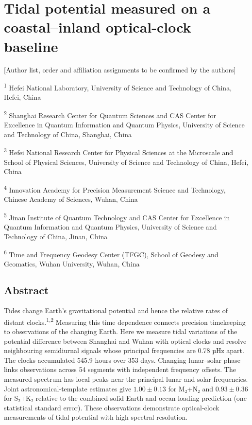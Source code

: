 \documentclass[
  10pt,
  a4paper,
]{article}
\author{}
\date{}
\begin{document}
\hypertarget{tidal-potential-measured-on-a-coastalinland-optical-clock-baseline}{%
\section{Tidal potential measured on a coastal--inland optical-clock
baseline}\label{tidal-potential-measured-on-a-coastalinland-optical-clock-baseline}}

{[}Author list, order and affiliation assignments to be confirmed by the
authors{]}

\textsuperscript{1} Hefei National Laboratory, University of Science and
Technology of China, Hefei, China

\textsuperscript{2} Shanghai Research Center for Quantum Sciences and
CAS Center for Excellence in Quantum Information and Quantum Physics,
University of Science and Technology of China, Shanghai, China

\textsuperscript{3} Hefei National Research Center for Physical Sciences
at the Microscale and School of Physical Sciences, University of Science
and Technology of China, Hefei, China

\textsuperscript{4} Innovation Academy for Precision Measurement Science
and Technology, Chinese Academy of Sciences, Wuhan, China

\textsuperscript{5} Jinan Institute of Quantum Technology and CAS Center
for Excellence in Quantum Information and Quantum Physics, University of
Science and Technology of China, Jinan, China

\textsuperscript{6} Time and Frequency Geodesy Center (TFGC), School of
Geodesy and Geomatics, Wuhan University, Wuhan, China

\hypertarget{abstract}{%
\subsection{Abstract}\label{abstract}}

Tides change Earth's gravitational potential and hence the relative
rates of distant clocks.\textsuperscript{1,2} Measuring this time
dependence connects precision timekeeping to observations of the
changing Earth. Here we measure tidal variations of the potential
difference between Shanghai and Wuhan with optical clocks and resolve
neighbouring semidiurnal signals whose principal frequencies are 0.78
µHz apart. The clocks accumulated 545.9 hours over 353 days. Changing
lunar--solar phase links observations across 54 segments with
independent frequency offsets. The measured spectrum has local peaks
near the principal lunar and solar frequencies. Joint
astronomical-template estimates give \(1.00\pm0.13\) for M₂+N₂ and
\(0.93\pm0.36\) for S₂+K₂ relative to the combined solid-Earth and
ocean-loading prediction (one statistical standard error). These
observations demonstrate optical-clock measurements of tidal potential
with high spectral resolution.
\end{document}
